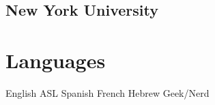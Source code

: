 \documentclass[]{deedy-resume-openfont}
\begin{document}
\begin{minipage}[t]{0.33\textwidth}
\subsection{New York University}
\vspace{\topsep}

\section{Languages}
\textbullet{}English
\textbullet{}ASL
\textbullet{}Spanish
\textbullet{}French
\textbullet{}Hebrew
\textbullet{}Geek/Nerd

\end{minipage} 
\end{document}
